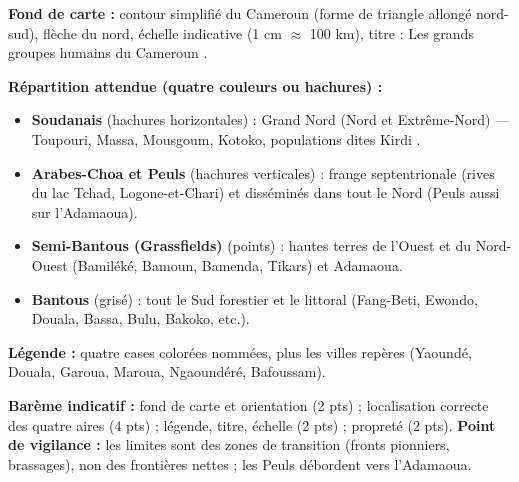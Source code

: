 \documentclass[11pt]{article}
\begin{document}
\begin{corrige}
\textbf{Fond de carte :} contour simplifié du Cameroun (forme de triangle allongé nord-sud), flèche du nord, échelle indicative (1 cm $\approx$ 100 km), titre : \og Les grands groupes humains du Cameroun \fg.

\textbf{Répartition attendue (quatre couleurs ou hachures) :}
\begin{itemize}
\item \textbf{Soudanais} (hachures horizontales) : Grand Nord (Nord et Extrême-Nord) — Toupouri, Massa, Mousgoum, Kotoko, populations dites \og Kirdi \fg.
\item \textbf{Arabes-Choa et Peuls} (hachures verticales) : frange septentrionale (rives du lac Tchad, Logone-et-Chari) et disséminés dans tout le Nord (Peuls aussi sur l'Adamaoua).
\item \textbf{Semi-Bantous (Grassfields)} (points) : hautes terres de l'Ouest et du Nord-Ouest (Bamiléké, Bamoun, Bamenda, Tikars) et Adamaoua.
\item \textbf{Bantous} (grisé) : tout le Sud forestier et le littoral (Fang-Beti, Ewondo, Douala, Bassa, Bulu, Bakoko, etc.).
\end{itemize}
\textbf{Légende :} quatre cases colorées nommées, plus les villes repères (Yaoundé, Douala, Garoua, Maroua, Ngaoundéré, Bafoussam).

\textbf{Barème indicatif :} fond de carte et orientation (2 pts) ; localisation correcte des quatre aires (4 pts) ; légende, titre, échelle (2 pts) ; propreté (2 pts).
\textbf{Point de vigilance :} les limites sont des zones de transition (fronts pionniers, brassages), non des frontières nettes ; les Peuls débordent vers l'Adamaoua.
\end{corrige}
\end{document}
